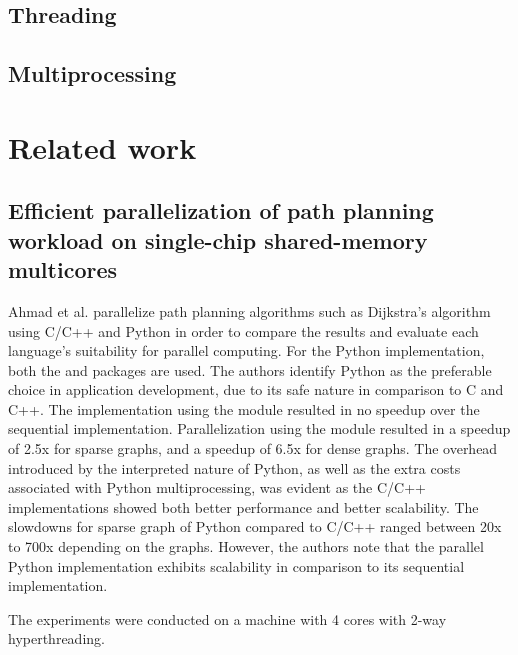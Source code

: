 \subsection{Threading}
\subsection{Multiprocessing}

\section{Related work}
\subsection{Efficient parallelization of path planning workload on single-chip shared-memory multicores}
Ahmad et al. \cite{ahmad_2015_efficient_epoppwossm} parallelize path planning algorithms such as Dijkstra's algorithm using C/C++ and
Python in order to compare the results and evaluate each language's suitability for parallel computing. For the Python implementation,
both the  and  packages are used. The authors identify Python as the preferable choice 
in application development, due to its safe nature in comparison to C and C++. The implementation using the 
module resulted in no speedup over the sequential implementation. Parallelization using the  module resulted
in a speedup of 2.5x for sparse graphs, and a speedup of 6.5x for dense graphs. The overhead introduced by the interpreted nature
of Python, as well as the extra costs associated with Python multiprocessing, was evident as the C/C++ implementations showed both
better performance and better scalability. The slowdowns for sparse graph of Python compared to C/C++ ranged between
20x to 700x depending on the graphs.
However, the authors note that the parallel Python implementation exhibits scalability in comparison to its sequential implementation.

The experiments were conducted on a machine with 4 cores with 2-way hyperthreading.


